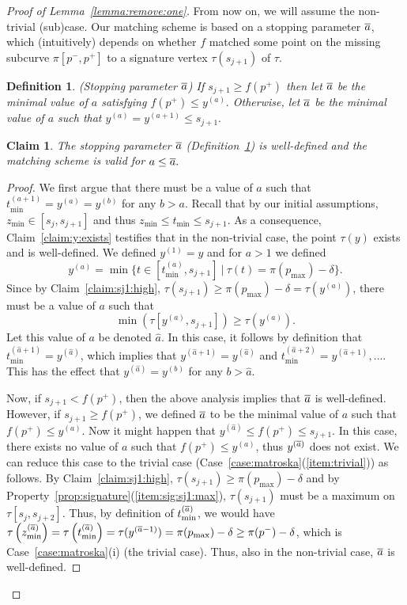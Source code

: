 \documentclass[11pt, letter]{article}
\newtheorem{definition}[theorem]{Definition}
\newtheorem{claim}[theorem]{Claim}
\newcommand{\lemref}[1]{Lemma~\ref{lemma:#1}}
\newcommand{\deflab}[1]{\label{def:#1}}
\newcommand{\defref}[1]{Definition~\ref{def:#1}}
\newcommand{\caseref}[1]{Case~\ref{case:#1}}
\newcommand{\claimref}[1]{Claim~\ref{claim:#1}}
\newcommand{\propref}[1]{Property~\ref{prop:#1}}
\newcommand{\minSubC}[4]{\ensuremath{\min( #1[#3,#4])}}
\begin{document}
\begin{proof}[Proof of \lemref{remove:one}]
From now on, we will assume the non-trivial (sub)case.  Our matching scheme is
based on a stopping parameter $\overline{a}$, which (intuitively) depends on whether
$f$ matched some point on the missing subcurve $\pi[p^{-},p^{+}]$ to a signature
vertex $\tau(s_{j+1})$ of $\tau$.

\begin{definition}(Stopping parameter $\overline{a}$)
If $s_{j+1} \geq f(p^{+})$ then let $\overline{a}$ be the minimal value of $a$
satisfying  $f(p^{+}) \leq y^{(a)}.$
Otherwise, let $\overline{a}$ be the minimal value of $a$ such that $y^{(a)} = y^{(a+1)} \leq s_{j+1}.$
\deflab{a:stop}
\end{definition}

\begin{claim}
The stopping parameter $\overline{a}$ (\defref{a:stop}) is well-defined 
and the matching scheme is valid for $a\leq \overline{a}.$ 
\end{claim}
\begin{proof}
\newcommand{\Astall}{\widehat{a}}
We first argue that there must be a value of $a$ such that 
$t_{\min}^{(a+1)}=y^{(a)}=y^{(b)}$ for any $b>a$.
Recall that by our initial assumptions, $z_{\min} \in [s_j,s_{j+1}]$ and 
thus $z_{\min} \leq t_{\min} \leq s_{j+1}$. As a consequence, \claimref{y:exists} 
testifies that in the non-trivial case, the point $\tau(y)$ exists and is well-defined.
We defined $y^{(1)}=y$ and for $a>1$ we defined
\[y^{(a)}= \min \{t \in [t_{\min}^{(a)},s_{j+1}] ~|~ \tau(t) = \pi(p_{\max}) - \delta\}.\]
Since by \claimref{sj1:high}, $\tau(s_{j+1}) \geq \pi(p_{\max})-\delta = \tau(y^{(a)})$,
there must be a value of $a$ such that 
\[\minSubC{\tau}{t}{y^{(a)}}{s_{j+1}} \geq \tau(y^{(a)}).\]
Let this value of $a$ be denoted $\Astall$.
In this case, it follows by definition that $t_{\min}^{(\Astall+1)} = y^{(\Astall)}$, 
which implies that $y^{(\Astall+1)}=y^{(\Astall)}$ and $t_{\min}^{(\Astall+2)}=y^{(\Astall+1)}, \dots$.
This has the effect that $y^{(\Astall)}=y^{(b)}$ for any $b > \Astall$.

Now, if $s_{j+1} < f(p^{+})$, then the above analysis implies that $\overline{a}$ is well-defined.
However, if $s_{j+1} \geq f(p^{+})$, we defined $\overline{a}$ to be the minimal value of $a$
such that $f(p^{+}) \leq y^{(a)}$. Now it might happen that $y^{(\Astall)} \leq f(p^{+}) \leq s_{j+1}$.
In this case, there exists no value of $a$ such that $f(p^{+}) \leq y^{(a)}$, thus $y^{(\overline{a})}$ does not exist.
We can reduce this case to the trivial case (\caseref{matroska}(\ref{item:trivial})) as follows. 
By \claimref{sj1:high}, $\tau(s_{j+1}) \geq \pi(p_{\max})-\delta$ and by
\propref{signature}(\ref{item:sig:sj1:max}), $\tau(s_{j+1})$ must be a maximum on $\tau[s_{j},
s_{j+2}]$. Thus, by definition of $t_{\min}^{(\overline{a})}$, we would have 
$\tau\left(z_{\min}^{(\overline{a})}\right) = \tau\left(t_{\min}^{(\overline{a})}\right) = \tau(y^{(\overline{a}-1)}) = \pi(p_{\max})-\delta \geq \pi(p^-)-\delta$, which is
\caseref{matroska}(i) (the trivial case).
Thus, also in the non-trivial case, $\overline{a}$ is well-defined.


\end{proof}
\end{proof}
\end{document}
